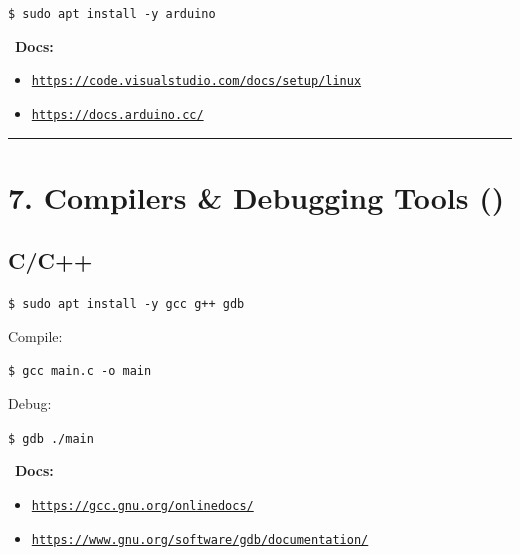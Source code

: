 \documentclass[12pt]{article}
\newcommand{\debugicon}{\faBug}
\newcommand{\bookicon}{\faBook}
\begin{document}
\begin{highlightbox}
\texttt{\$ sudo apt install -y arduino}
\end{highlightbox}

\begin{infobox}
\bookicon\ \textbf{Docs:}
\begin{itemize}
    \item \href{https://code.visualstudio.com/docs/setup/linux}{\texttt{https://code.visualstudio.com/docs/setup/linux}}
    \item \href{https://docs.arduino.cc/}{\texttt{https://docs.arduino.cc/}}
\end{itemize}
\end{infobox}

\vspace{1em}
\begin{center}
\color{teamred}\rule{0.8\textwidth}{1pt}
\end{center}

\section*{7. Compilers \& Debugging Tools (\debugicon)}

\subsection*{C/C++}

\begin{highlightbox}
\texttt{\$ sudo apt install -y gcc g++ gdb}
\end{highlightbox}

Compile:

\begin{highlightbox}
\texttt{\$ gcc main.c -o main}
\end{highlightbox}

Debug:

\begin{highlightbox}
\texttt{\$ gdb ./main}
\end{highlightbox}

\begin{infobox}
\bookicon\ \textbf{Docs:}
\begin{itemize}
    \item \href{https://gcc.gnu.org/onlinedocs/}{\texttt{https://gcc.gnu.org/onlinedocs/}}
    \item \href{https://www.gnu.org/software/gdb/documentation/}{\texttt{https://www.gnu.org/software/gdb/documentation/}}
\end{itemize}
\end{infobox}
\end{document}
